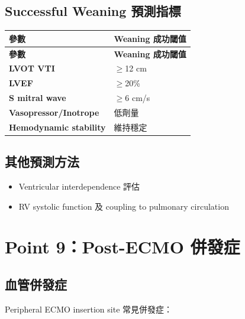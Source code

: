 \documentclass[12pt,a4paper]{article}
\begin{document}
\subsection{Successful Weaning 預測指標}

\begin{longtable}{p{5cm}p{9cm}}
\toprule
\textbf{參數} & \textbf{Weaning 成功閾值} \\
\midrule
\endfirsthead

\toprule
\textbf{參數} & \textbf{Weaning 成功閾值} \\
\midrule
\endhead

\bottomrule
\endfoot

\textbf{LVOT VTI} & $\geq$12 cm \\
\midrule
\textbf{LVEF} & $\geq$20\% \\
\midrule
\textbf{S mitral wave} & $\geq$6 cm/s \\
\midrule
\textbf{Vasopressor/Inotrope} & 低劑量 \\
\midrule
\textbf{Hemodynamic stability} & 維持穩定 \\
\bottomrule
\end{longtable}

\subsection{其他預測方法}

\begin{itemize}
    \item Ventricular interdependence 評估
    \item RV systolic function 及 coupling to pulmonary circulation
\end{itemize}

\section{Point 9：Post-ECMO 併發症}

\subsection{血管併發症}

Peripheral ECMO insertion site 常見併發症：
\end{document}
